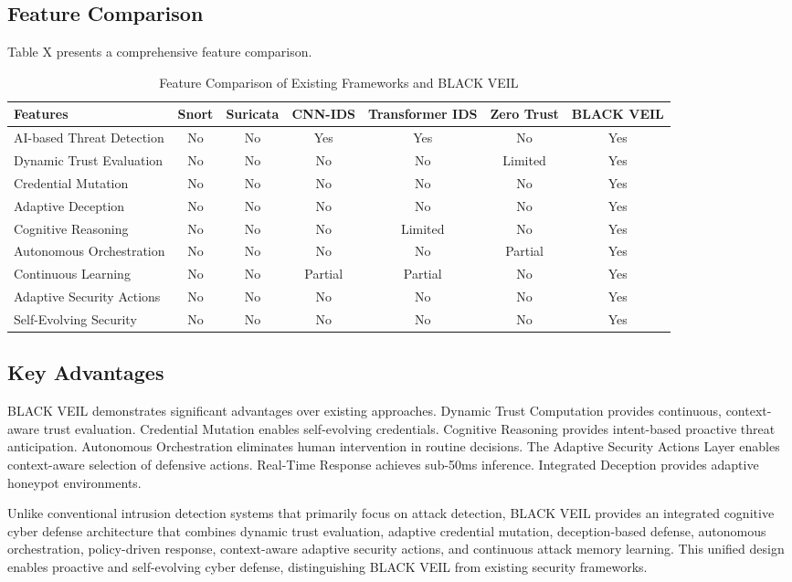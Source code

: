 \documentclass[12pt]{article}
\begin{document}
\subsection{Feature Comparison}
Table X presents a comprehensive feature comparison.

\begin{table}[H]
\centering
\caption{Feature Comparison of Existing Frameworks and BLACK VEIL}
\scriptsize
\begin{tabular}{|l|c|c|c|c|c|c|}
\hline
\textbf{Features} & \textbf{Snort} & \textbf{Suricata} & \textbf{CNN-IDS} & \textbf{Transformer IDS} & \textbf{Zero Trust} & \textbf{BLACK VEIL} \\
\hline
AI-based Threat Detection & No & No & Yes & Yes & No & Yes \\
Dynamic Trust Evaluation & No & No & No & No & Limited & Yes \\
Credential Mutation & No & No & No & No & No & Yes \\
Adaptive Deception & No & No & No & No & No & Yes \\
Cognitive Reasoning & No & No & No & Limited & No & Yes \\
Autonomous Orchestration & No & No & No & No & Partial & Yes \\
Continuous Learning & No & No & Partial & Partial & No & Yes \\
Adaptive Security Actions & No & No & No & No & No & Yes \\
Self-Evolving Security & No & No & No & No & No & Yes \\
\hline
\end{tabular}
\label{tab:feature_comparison}
\end{table}

\subsection{Key Advantages}
BLACK VEIL demonstrates significant advantages over existing approaches. Dynamic Trust Computation provides continuous, context-aware trust evaluation. Credential Mutation enables self-evolving credentials. Cognitive Reasoning provides intent-based proactive threat anticipation. Autonomous Orchestration eliminates human intervention in routine decisions. The Adaptive Security Actions Layer enables context-aware selection of defensive actions. Real-Time Response achieves sub-50ms inference. Integrated Deception provides adaptive honeypot environments.

Unlike conventional intrusion detection systems that primarily focus on attack detection, BLACK VEIL provides an integrated cognitive cyber defense architecture that combines dynamic trust evaluation, adaptive credential mutation, deception-based defense, autonomous orchestration, policy-driven response, context-aware adaptive security actions, and continuous attack memory learning. This unified design enables proactive and self-evolving cyber defense, distinguishing BLACK VEIL from existing security frameworks.
\end{document}
